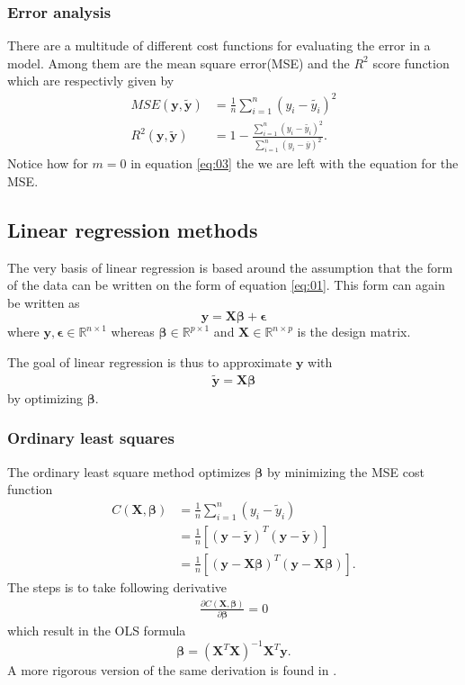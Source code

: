 \documentclass[uio,jmp,amsmath,amssymb,reprint,nofootinbib]{revtex4-1}
\numberwithin{equation}{section}
\newcommand{\lp}{\left(}
\newcommand{\rp}{\right)}
\newcommand{\lsb}{\left[}
\newcommand{\rsb}{\right]}
\begin{document}
\subsubsection{Error analysis}

There are a multitude of different cost functions for evaluating the error in a model. Among them are the mean square error(MSE) and the \(R^2\) score function which are respectivly given by
\begin{align}\label{eq:05}
    MSE(\bm{y}, \bm{\tilde{y}}) &= \frac{1}{n}\sum_{i=1}^n(y_i - \tilde{y_i})^2\\ \label{eq:11}
    R^2(\bm{y}, \bm{\tilde{y}}) &= 1 - \frac{\sum_{i=1}^n(y_i - \tilde{y_i})^2}{\sum_{i=1}^n(y_i - \overline{y})^2}. 
\end{align}
Notice how for \(m=0\) in equation \ref{eq:03} the we are left with the equation for the MSE.

\subsection{Linear regression methods}

The very basis of linear regression is based around the assumption that the form of the data can be written on the form of equation \ref{eq:01}. This form can again be written as
\begin{equation}
    \bm{y} = \bm{X}\bm{\beta} + \bm{\epsilon}
\end{equation}
where \(\bm{y}, \bm{\epsilon} \in \mathbb{R}^{n\times 1}\) whereas \(\bm{\beta} \in \mathbb{R}^{p\times 1}\) and \(\bm{X}  \in \mathbb{R}^{n\times p}\) is the design matrix.

The goal of linear regression is thus to approximate \(\bm{y}\) with
\begin{align}\label{eq:10}
    \bm{\tilde{y}} = \bm{X}\bm{\beta}
\end{align}
by optimizing \(\bm{\beta}\). 

\subsubsection{Ordinary least squares}

The ordinary least square method optimizes \(\bm{\beta}\) by minimizing the MSE cost function
\begin{align}
    C(\bm{X, \beta}) &= \frac{1}{n}\sum_{i=1}^n(y_i-\tilde{y}_i)\\
    &= \frac{1}{n}\lsb \lp \bm{y} - \bm{\tilde{y}}\rp^T\lp \bm{y} - \bm{\tilde{y}}\rp\rsb\\
    &= \frac{1}{n}\lsb \lp \bm{y} - \bm{X}\bm{\beta}\rp^T\lp \bm{y} - \bm{X}\bm{\beta}\rp\rsb.
\end{align}
The steps is to take following derivative
\begin{align}
    \frac{\partial C(\bm{X, \beta})}{\partial\bm{\beta}} = 0
\end{align}
which result in the OLS formula
\begin{equation}\label{eq:06}
    \bm{\beta} = (\bm{X}^T\bm{X})^{-1}\bm{X}^T\bm{y}.
\end{equation}
A more rigorous version of the same derivation is found in \cite{MHJ_LinReg}.
\end{document}
